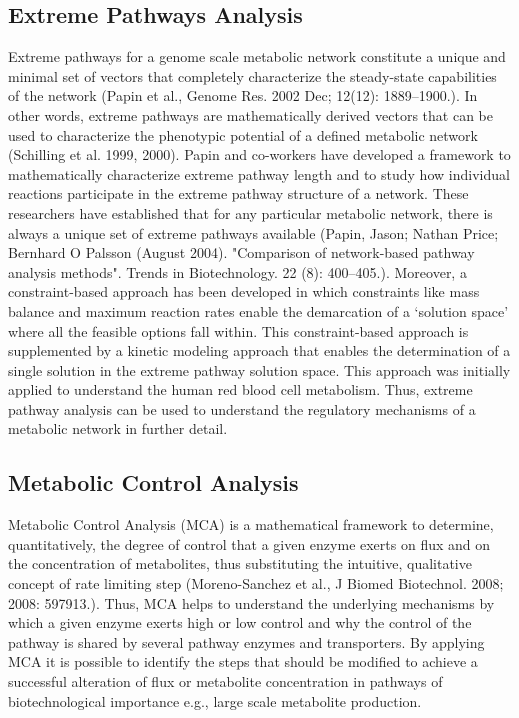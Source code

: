 \subsection{Extreme Pathways Analysis}
Extreme pathways for a genome scale metabolic network constitute a unique and minimal set of vectors that completely characterize the steady-state capabilities of the network (Papin et al., Genome Res. 2002 Dec; 12(12): 1889–1900.). In other words, extreme pathways are mathematically derived vectors that can be used to characterize the phenotypic potential of a defined metabolic network (Schilling et al. 1999, 2000). Papin and co-workers have developed a framework to mathematically characterize extreme pathway length and to study how individual reactions participate in the extreme pathway structure of a network. These researchers have established that for any particular metabolic network, there is always a unique set of extreme pathways available (Papin, Jason; Nathan Price; Bernhard O Palsson (August 2004). "Comparison of network-based pathway analysis methods". Trends in Biotechnology. 22 (8): 400–405.). Moreover, a constraint-based approach has been developed in which constraints like mass balance and maximum reaction rates enable the demarcation of a ‘solution space’ where all the feasible options fall within. This constraint-based approach is supplemented by a kinetic modeling approach that enables the determination of a single solution in the extreme pathway solution space. This approach was initially applied to understand the human red blood cell metabolism. Thus, extreme pathway analysis can be used to understand the regulatory mechanisms of a metabolic network in further detail.

\subsection{Metabolic Control Analysis}
Metabolic Control Analysis (MCA) is a mathematical framework to determine, quantitatively, the degree of control that a given enzyme exerts on flux and on the concentration of metabolites, thus substituting the intuitive, qualitative concept of rate limiting step (Moreno-Sanchez et al., J Biomed Biotechnol. 2008; 2008: 597913.). Thus, MCA helps to understand the underlying mechanisms by which a given enzyme exerts high or low control and why the control of the pathway is shared by several pathway enzymes and transporters. By applying MCA it is possible to identify the steps that should be modified to achieve a successful alteration of flux or metabolite concentration in pathways of biotechnological importance e.g., large scale metabolite production.

